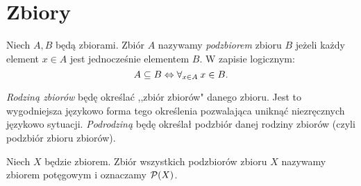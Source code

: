 \section{Zbiory}{
    \label{chp:sets}
    \begin{definition}[Podzbiór]
        Niech $A, B$ będą zbiorami. Zbiór $A$ nazywamy \emph{podzbiorem} zbioru $B$ jeżeli każdy element $x\in A$ jest jednocześnie elementem $B$. W zapisie logicznym:
        $$A\subseteq B \Leftrightarrow \forall_{x\in A}\: x\in B.$$
    \end{definition}
    \emph{Rodziną zbiorów} będę określać ,,zbiór zbiorów" danego zbioru. Jest to wygodniejsza językowo forma tego określenia pozwalająca uniknąć niezręcznych językowo sytuacji. \emph{Podrodziną} będę określał podzbiór danej rodziny zbiorów (czyli podzbiór zbioru zbiorów).
    \begin{definition}
        \label{def:powerset}
        Niech $X$ będzie zbiorem. Zbiór wszystkich podzbiorów zbioru $X$ nazywamy zbiorem potęgowym i oznaczamy $\mathcal{P}(X)$.
    \end{definition}
}